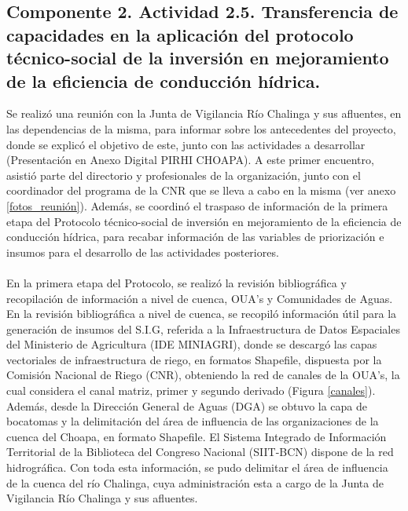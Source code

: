 \documentclass[]{article}
\begin{document}
\clearpage
\subsection{Componente 2. Actividad 2.5. Transferencia de capacidades en la aplicación del protocolo técnico-social de la inversión en mejoramiento de la eficiencia de conducción hídrica.} \label{info}

Se realizó una reunión con la Junta de Vigilancia Río Chalinga y sus afluentes, en las dependencias de la misma, para informar sobre los antecedentes del proyecto, donde se explicó el objetivo de este, junto con las actividades a desarrollar (Presentación en Anexo Digital PIRHI CHOAPA). A este primer encuentro, asistió parte del directorio y profesionales de la organización, junto con el coordinador del programa de la CNR que se lleva a cabo en la misma (ver anexo \ref{fotos_reunión}). Además, se coordinó el traspaso de información de la primera etapa del Protocolo técnico-social de inversión en mejoramiento de la eficiencia de conducción hídrica, para recabar información de las variables de priorización e insumos para el desarrollo de las actividades posteriores. \\
\\
En la primera etapa del Protocolo, se realizó la revisión bibliográfica y recopilación de información a nivel de cuenca, OUA's y Comunidades de Aguas. En la revisión bibliográfica a nivel de cuenca, se recopiló información útil para la generación de insumos del S.I.G, referida a la Infraestructura de Datos Espaciales del Ministerio de Agricultura (IDE MINIAGRI), donde se descargó las capas vectoriales de infraestructura de riego, en formatos Shapefile, dispuesta por la  Comisión Nacional de Riego (CNR), obteniendo la red de canales de la OUA's, la cual considera el canal matriz, primer y segundo derivado (Figura \ref{canales}). Además, desde la Dirección General de Aguas (DGA) se obtuvo la capa de bocatomas y la delimitación del área de influencia de las organizaciones de la cuenca del Choapa, en formato Shapefile. El Sistema Integrado de Información Territorial de la Biblioteca del Congreso Nacional (SIIT-BCN) dispone de la red hidrográfica. Con toda esta información, se pudo delimitar el área de influencia de la cuenca del río Chalinga, cuya administración esta a cargo de la Junta de Vigilancia Río Chalinga y sus afluentes. \\
\\
\end{document}
